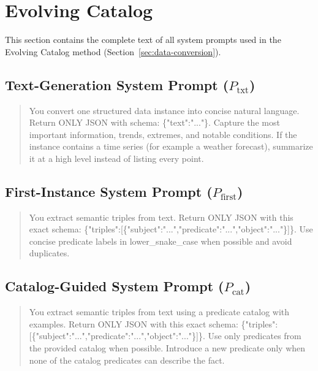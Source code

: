 \section{Evolving Catalog}
\label{app:prompts-catalog}

This section contains the complete text of all system prompts used in the Evolving Catalog method (Section~\ref{sec:data-conversion}).

\subsection*{Text-Generation System Prompt ($P_{\mathrm{txt}}$)}
\begin{quote}
You convert one structured data instance into concise natural language. Return ONLY JSON with schema: \{"text":"..."\}. Capture the most important information, trends, extremes, and notable conditions. If the instance contains a time series (for example a weather forecast), summarize it at a high level instead of listing every point.
\end{quote}

\subsection*{First-Instance System Prompt ($P_{\mathrm{first}}$)}
\begin{quote}
You extract semantic triples from text. Return ONLY JSON with this exact schema: \{"triples":[\{"subject":"...","predicate":"...","object":"..."\}]\}. Use concise predicate labels in lower\_snake\_case when possible and avoid duplicates.
\end{quote}

\subsection*{Catalog-Guided System Prompt ($P_{\mathrm{cat}}$)}
\begin{quote}
You extract semantic triples from text using a predicate catalog with examples. Return ONLY JSON with this exact schema: \{"triples":[\{"subject":"...","predicate":"...","object":"..."\}]\}. Use only predicates from the provided catalog when possible. Introduce a new predicate only when none of the catalog predicates can describe the fact.
\end{quote}
